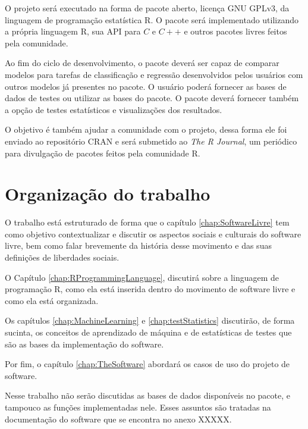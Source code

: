 O projeto será executado na forma de pacote aberto, licença GNU GPLv3, da linguagem de programação estatística R. O pacote será implementado utilizando a própria linguagem R, sua API para $C$ e $C++$ e outros pacotes livres feitos pela comunidade.

Ao fim do ciclo de desenvolvimento, o pacote deverá ser capaz de comparar modelos para tarefas de classificação e regressão desenvolvidos pelos usuários com outros modelos já presentes no pacote.  O usuário poderá fornecer as bases de dados de testes ou utilizar as bases do pacote. O pacote deverá fornecer também a opção de testes estatísticos e visualizações dos resultados.

O objetivo é também ajudar a comunidade com o projeto, dessa forma ele foi enviado ao repositório CRAN e será submetido ao \textit{The R Journal}, um periódico para divulgação de pacotes feitos pela comunidade R.


\section{Organização do trabalho}
\label{sec:organizacaoTrabalho}

O trabalho está estruturado de forma que o capítulo \ref{chap:SoftwareLivre} tem como objetivo contextualizar e discutir os aspectos sociais e culturais do software livre, bem como falar brevemente da história desse movimento e das suas definições de liberdades sociais.

O Capítulo \ref{chap:RProgrammingLanguage}, discutirá sobre a linguagem de programação R, como ela está inserida dentro do movimento de software livre e como ela está organizada. 

Os capítulos \ref{chap:MachineLearning} e \ref{chap:testStatistics} discutirão, de forma sucinta, os conceitos de aprendizado de máquina e de estatísticas de testes que são as bases da implementação do software. 

Por fim, o capítulo \ref{chap:TheSoftware} abordará os casos de uso do projeto de software.

Nesse trabalho não serão discutidas as bases de dados disponíveis no pacote, e tampouco as funções implementadas nele. Esses assuntos são tratadas na documentação do software que se encontra no anexo XXXXX.
